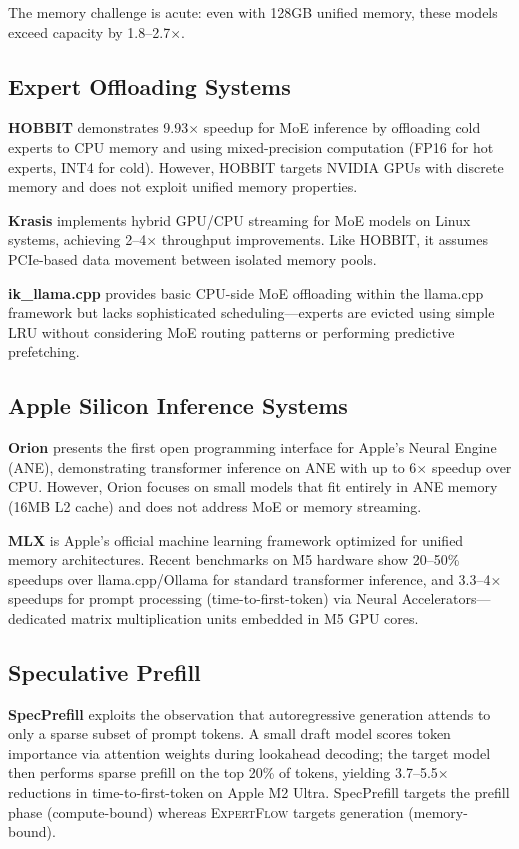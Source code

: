 \documentclass[11pt]{article}
\begin{document}
The memory challenge is acute: even with 128GB unified memory, these models exceed capacity by 1.8--2.7$\times$.

\subsection{Expert Offloading Systems}

\textbf{HOBBIT} \cite{hobbit2024} demonstrates 9.93$\times$ speedup for MoE inference by offloading cold experts to CPU memory and using mixed-precision computation (FP16 for hot experts, INT4 for cold). However, HOBBIT targets NVIDIA GPUs with discrete memory and does not exploit unified memory properties.

\textbf{Krasis} \cite{krasis2024} implements hybrid GPU/CPU streaming for MoE models on Linux systems, achieving 2--4$\times$ throughput improvements. Like HOBBIT, it assumes PCIe-based data movement between isolated memory pools.

\textbf{ik\_llama.cpp} \cite{ikllama} provides basic CPU-side MoE offloading within the llama.cpp framework but lacks sophisticated scheduling—experts are evicted using simple LRU without considering MoE routing patterns or performing predictive prefetching.

\subsection{Apple Silicon Inference Systems}

\textbf{Orion} \cite{orion2025} presents the first open programming interface for Apple's Neural Engine (ANE), demonstrating transformer inference on ANE with up to 6$\times$ speedup over CPU. However, Orion focuses on small models that fit entirely in ANE memory (16MB L2 cache) and does not address MoE or memory streaming.

\textbf{MLX} \cite{mlx2026} is Apple's official machine learning framework optimized for unified memory architectures. Recent benchmarks on M5 hardware show 20--50\% speedups over llama.cpp/Ollama for standard transformer inference, and 3.3--4$\times$ speedups for prompt processing (time-to-first-token) via Neural Accelerators—dedicated matrix multiplication units embedded in M5 GPU cores.

\subsection{Speculative Prefill}

\textbf{SpecPrefill} \cite{specprefill2026} exploits the observation that autoregressive generation attends to only a sparse subset of prompt tokens. A small draft model scores token importance via attention weights during lookahead decoding; the target model then performs sparse prefill on the top 20\% of tokens, yielding 3.7--5.5$\times$ reductions in time-to-first-token on Apple M2 Ultra. SpecPrefill targets the prefill phase (compute-bound) whereas \textsc{ExpertFlow} targets generation (memory-bound).
\end{document}
